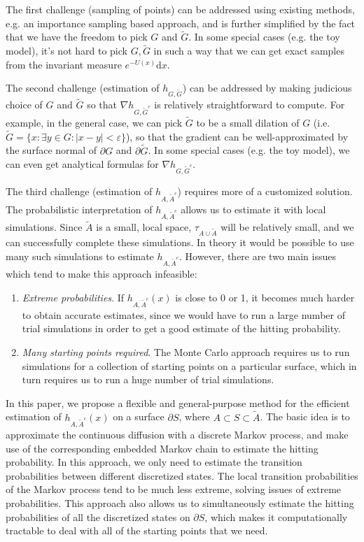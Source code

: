 \documentclass[english, aip, jcp, priprint, graphicx,floatfix]{revtex4-1}
\theoremstyle{plain}
\theoremstyle{definition}
\theoremstyle{plain}
\begin{document}
The first challenge (sampling of points) can be addressed using existing methods, e.g. an importance sampling based approach, and is further simplified by the fact that we have the freedom to pick $G$ and $\tilde{G}$. In some special cases (e.g. the toy model), it's not hard to pick $G, \tilde{G}$ in such a way that we can get exact samples from the invariant measure $e^{- U (x)} \mathrm{d} x$.

The second challenge (estimation of $h_{G,\tilde G}$) can be addressed by making judicious choice of $G$ and
$\tilde{G}$ so that $\nabla h_{G, \tilde{G}^c}$ is relatively straightforward
to compute. For example, in the general case, we can pick $\tilde{G}$ to be a
small dilation of $G$ (i.e. $\tilde{G} = \{ x : \exists y \in G : | x - y | <
\varepsilon \}$), so that the gradient can be well-approximated by the surface
normal of $\partial G$ and $\partial \tilde{G}$. In some special cases (e.g.
the toy model), we can even get analytical formulas for $\nabla h_{G,
\tilde{G}^c}$.

The third challenge (estimation of $h_{A,\tilde A^c}$) requires more of a customized solution. The probabilistic interpretation of $h_{A, \tilde{A}^c}$ allows us to estimate it with local simulations. Since $\tilde{A}$ is a small, local space, $\tau_{A \cup \tilde{A}}$ will be relatively small, and we can successfully complete these simulations. In theory it would be possible to use many such simulations to estimate $h_{A,\tilde{A}^c}$. However, there are two main issues which tend to make this approach infeasible:
\begin{enumerate}[noitemsep]
\item \emph{Extreme probabilities}.  If $h_{A, \tilde{A}^c} (x)$ is close to 0 or 1, it becomes much harder
to obtain accurate estimates, since we would have to run a large number of
trial simulations in order to get a good estimate of the hitting
probability.

\item \emph{Many starting points required}.  The Monte Carlo approach requires us to run simulations for a collection of starting points on a particular surface, which in turn requires us to run a huge number of trial simulations. 
\end{enumerate}
In this paper, we propose a flexible and general-purpose method for the
efficient estimation of $h_{A, \tilde{A}^c} (x)$ on a surface $\partial S$, where $A \subset S \subset \tilde{A}$. The basic idea is to approximate the continuous diffusion with a discrete Markov process, and make use of the corresponding embedded Markov chain to estimate the hitting probability. In this approach, we only need to estimate the transition probabilities between different discretized states. The local transition probabilities of the Markov process tend to be much less extreme, solving issues of extreme probabilities.  This approach also allows us to simultaneously estimate the hitting probabilities of all the discretized states on $\partial S$, which makes it computationally tractable to deal with all of the starting points that we need.
\end{document}
